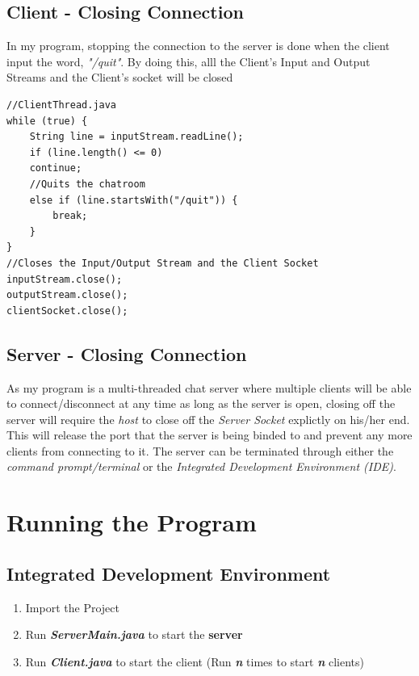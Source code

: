 \documentclass[a4paper,11pt]{article}
\begin{document}
\subsection{Client - Closing Connection}
In my program, stopping the connection to the server is done when the client input the word, \textit{"/quit"}. By doing this, alll the Client's Input and Output Streams and the Client's socket will be closed 
\begin{mdframed}[backgroundcolor=light-gray, roundcorner=30pt,leftmargin=1, rightmargin=1, innerleftmargin=5, innertopmargin=-3,innerbottommargin=5, outerlinewidth=1, linecolor=light-gray]
\begin{lstlisting}
//ClientThread.java
while (true) {
	String line = inputStream.readLine();
	if (line.length() <= 0)
	continue;
	//Quits the chatroom
	else if (line.startsWith("/quit")) {
		break;
	}
}
//Closes the Input/Output Stream and the Client Socket
inputStream.close();
outputStream.close();
clientSocket.close();
\end{lstlisting}
\end{mdframed}

\subsection{Server - Closing Connection}
As my program is a multi-threaded chat server where multiple clients will be able to connect/disconnect at any time as long as the server is open, closing off the server will require the \textit{host} to close off the \textit{Server Socket} explictly on his/her end. This will release the port that the server is being binded to and prevent any more clients from connecting to it. The server can be terminated through either the \textit{command prompt/terminal} or the \textit{Integrated Development Environment (IDE)}.

\section{Running the Program}
\subsection{Integrated Development Environment}
\begin{enumerate}
  \item Import the Project
  \item Run \textbf{\textit{ServerMain.java}} to start the \textbf{server}  
  \item  Run \textbf{\textit{Client.java}} to start the client (Run \textit{\textbf{n}} times to start \textit{\textbf{n}} clients)
\end{enumerate}
\end{document}
